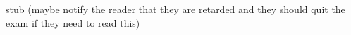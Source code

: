 \documentclass[../main.tex]{subfiles}
\begin{document}
stub (maybe notify the reader that they are retarded and they should quit the exam if they need to read this)
\end{document}
